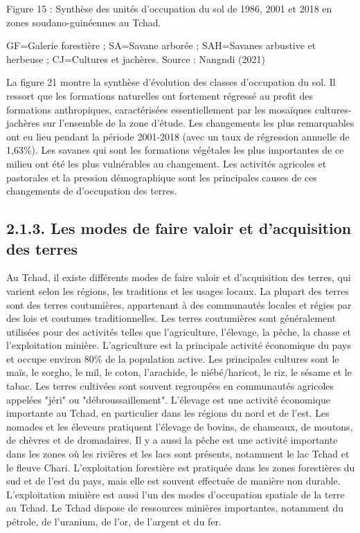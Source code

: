 \documentclass[12pt,oneside]{report}
\begin{document}
Figure 15 : Synthèse des unités d’occupation du sol de 1986, 2001 et 2018 en zones soudano-guinéennes au Tchad.

GF=Galerie forestière ; SA=Savane arborée ; SAH=Savanes arbustive et herbeuse ; CJ=Cultures et jachères. Source : Nangndi (2021)

La figure 21 montre la synthèse d’évolution des classes d’occupation du sol. Il ressort que les formations naturelles ont fortement régressé au profit des formations anthropiques, caractérisées essentiellement par les mosaïques cultures-jachères sur l’ensemble de la zone d’étude. Les changements les plus remarquables ont eu lieu pendant la période 2001-2018 (avec un taux de régression annuelle de 1,63\%). Les savanes qui sont les formations végétales les plus importantes de ce milieu ont été les plus vulnérables au changement. Les activités agricoles et pastorales et la pression démographique sont les principales causes de ces changements de d’occupation des terres.

\subsection{2.1.3. Les modes de faire valoir et d’acquisition des terres}
Au Tchad, il existe différents modes de faire valoir et d'acquisition des terres, qui varient selon les régions, les traditions et les usages locaux. La plupart des terres sont des terres coutumières, appartenant à des communautés locales et régies par des lois et coutumes traditionnelles. Les terres coutumières sont généralement utilisées pour des activités telles que l'agriculture, l'élevage, la pêche, la chasse et l’exploitation minière. L'agriculture est la principale activité économique du pays et occupe environ 80\% de la population active. Les principales cultures sont le maïs, le sorgho, le mil, le coton, l’arachide, le niébé/haricot, le riz, le sésame et le tabac. Les terres cultivées sont souvent regroupées en communautés agricoles appelées "jéri" ou "débroussaillement". L'élevage est une activité économique importante au Tchad, en particulier dans les régions du nord et de l'est. Les nomades et les éleveurs pratiquent l'élevage de bovins, de chameaux, de moutons, de chèvres et de dromadaires. Il y a aussi la pêche est une activité importante dans les zones où les rivières et les lacs sont présents, notamment le lac Tchad et le fleuve Chari. L'exploitation forestière est pratiquée dans les zones forestières du sud et de l'est du pays, mais elle est souvent effectuée de manière non durable. L'exploitation minière est aussi l’un des modes d’occupation spatiale de la terre au Tchad. Le Tchad dispose de ressources minières importantes, notamment du pétrole, de l'uranium, de l'or, de l'argent et du fer.
\end{document}
